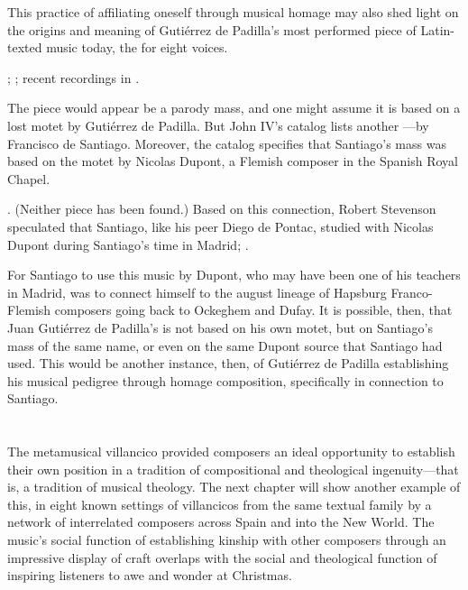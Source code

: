 This practice of affiliating oneself through musical homage may also shed light
on the origins and meaning of Gutiérrez de Padilla's most performed piece of Latin-texted
music today, the  for eight voices.%
\begin{Footnote}
    ; \autocite{Padilla:MissaEgoFlosCampi}; recent
    recordings in \autocites{Mauleon:PadillaPalafox}{Skidmore:NewWorldCD}.
\end{Footnote}
The piece would appear be a parody mass, and one might assume it is based on a
lost motet  by Gutiérrez de Padilla.
But John IV's catalog lists another ---by Francisco de Santiago.
Moreover, the catalog specifies that Santiago's mass was based on the motet
 by Nicolas Dupont, a Flemish composer in the Spanish
Royal Chapel.%
\begin{Footnote}
    \Autocites
    [417, caixão 34, : ] {JohnIV:Catalog}
    [381, caixão 32, : .]
    {JohnIV:Catalog}.
    (Neither piece has been found.)
    Based on this connection, Robert Stevenson speculated that Santiago, like his
    peer Diego de Pontac, studied with Nicolas Dupont during Santiago's time in
    Madrid; \autocite{Stevenson:SantiagoF}.
\end{Footnote}
For Santiago to use this music by Dupont, who may have been one of his teachers
in Madrid, was to connect himself to the august lineage of Hapsburg
Franco-Flemish composers going back to Ockeghem and Dufay.
It is possible, then, that Juan Gutiérrez de Padilla's  is not based on his own motet, but on Santiago's mass of the same
name, or even on the same Dupont source that Santiago had used.
This would be another instance, then, of Gutiérrez de Padilla establishing his musical
pedigree through homage composition, specifically in connection to Santiago.

\section{}

The metamusical villancico provided composers an ideal opportunity to establish
their own position in a tradition of compositional and theological
ingenuity---that is, a tradition of musical theology.
The next chapter will show another example of this, in eight known settings of
villancicos from the same textual family by a network of interrelated composers
across Spain and into the New World.
The music's social function of establishing kinship with other composers through
an impressive display of craft overlaps with the social and theological function
of inspiring listeners to awe and wonder at Christmas.

